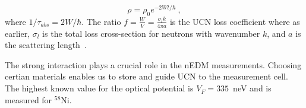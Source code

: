 \begin{equation}
\rho = \rho_0 e^{-2Wt/\hbar}~,
\end{equation}
where $1/\tau_{abs} = 2W/\hbar$.  The ratio
$f = \frac{W}{V} = \frac{\sigma_l k}{4 \pi a}$ is the UCN loss
coefficient where as earlier, $\sigma_l$ is the total loss
cross-section for neutrons with wavenumber $k$, and $a$ is the
scattering length~\cite{ucnbook}.

The strong interaction plays a crucial role in the nEDM
measurements. Choosing certian materials enables us to store and guide
UCN to the measurement cell.  The highest known value for the optical
potential is $V_F=335$~neV and is measured for $^{58}$Ni.





